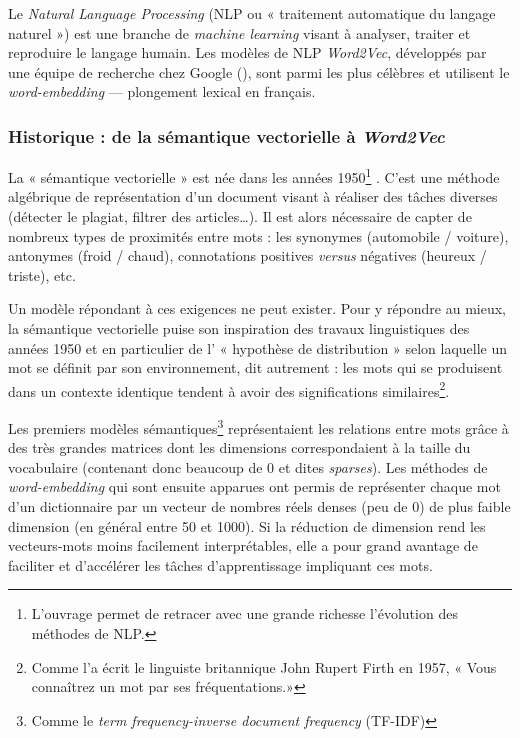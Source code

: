 \documentclass[11pt,french,french]{article}
\let\rmarkdownfootnote\footnote%
\def\footnote{\protect\rmarkdownfootnote}
\begin{document}
Le \emph{Natural Language Processing} (NLP ou « traitement automatique
du langage naturel ») est une branche de \emph{machine learning} visant
à analyser, traiter et reproduire le langage humain. Les modèles de NLP
\emph{Word2Vec}, développés par une équipe de recherche chez Google
(\cite{Mikolov}), sont parmi les plus célèbres et utilisent le
\emph{word-embedding} --- plongement lexical en français.

\subsubsection{\texorpdfstring{Historique : de la sémantique vectorielle
à
\emph{Word2Vec}}{Historique : de la sémantique vectorielle à Word2Vec}}\label{historique-de-la-suxe9mantique-vectorielle-uxe0-word2vec}

La « sémantique vectorielle » est née dans les années 1950\footnote{L'ouvrage
  \cite{Jurafsky} permet de retracer avec une grande richesse
  l'évolution des méthodes de NLP.} . C'est une méthode algébrique de
représentation d'un document visant à réaliser des tâches diverses
(détecter le plagiat, filtrer des articles\dots). Il est alors
nécessaire de capter de nombreux types de proximités entre mots : les
synonymes (automobile / voiture), antonymes (froid / chaud),
connotations positives \emph{versus} négatives (heureux / triste), etc.

Un modèle répondant à ces exigences ne peut exister. Pour y répondre au
mieux, la sémantique vectorielle puise son inspiration des travaux
linguistiques des années 1950 et en particulier de l' « hypothèse de
distribution » selon laquelle un mot se définit par son environnement,
dit autrement : les mots qui se produisent dans un contexte identique
tendent à avoir des significations similaires\footnote{Comme l'a écrit
  le linguiste britannique John Rupert Firth en 1957, « Vous connaîtrez
  un mot par ses fréquentations.»}.

Les premiers modèles sémantiques\footnote{Comme le \emph{term
  frequency-inverse document frequency} (TF-IDF)} représentaient les
relations entre mots grâce à des très grandes matrices dont les
dimensions correspondaient à la taille du vocabulaire (contenant donc
beaucoup de 0 et dites \emph{sparses}). Les méthodes de
\emph{word-embedding} qui sont ensuite apparues ont permis de
représenter chaque mot d'un dictionnaire par un vecteur de nombres réels
denses (peu de 0) de plus faible dimension (en général entre 50 et
1000). Si la réduction de dimension rend les vecteurs-mots moins
facilement interprétables, elle a pour grand avantage de faciliter et
d'accélérer les tâches d'apprentissage impliquant ces mots.
\end{document}
